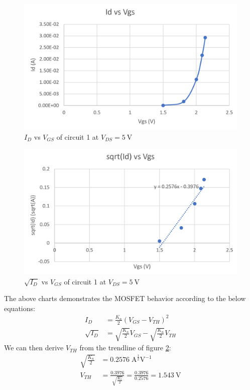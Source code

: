 \documentclass{article}
\begin{document}
\begin{figure}[H]
  \centering
  \includegraphics[width=\textwidth]{ECE2200L_Lab7_IV_1.png}
  \caption{$I_D$ vs $V_{GS}$ of circuit 1 at $V_{DS} = \SI{5}{\volt}$}
  \label{fig:IV1}
\end{figure}
\begin{figure}[H]
  \centering
  \includegraphics[width=\textwidth]{ECE2200L_Lab7_sqrt.png}
  \caption{$\sqrt{I_D}$ vs $V_{GS}$ of circuit 1 at $V_{DS} = \SI{5}{\volt}$}
  \label{fig:sqrt}
\end{figure}

The above charts demonstrates the MOSFET behavior according to the below equations:
\begin{align}\label{eqn:ckt1}
  I_D&=\frac{K_n}{2}\left(V_{GS}-V_{TH}\right)^2\\
  \sqrt{I_D}&=\sqrt{\frac{K_n}{2}}V_{GS}-\sqrt{\frac{K_n}{2}}V_{TH}
\end{align}
We can then derive $V_{TH}$ from the trendline of figure \ref{fig:sqrt}:
\begin{align}\label{eqn:calc1}
  \sqrt{\frac{K_n}{2}}&=0.2576\;\text{A}^{\frac{1}{2}}\text{V}^{-1}\\
  V_{TH}&= \frac{0.3976}{\sqrt{\frac{K_n}{2}}}=\frac{0.3976}{0.2576}=\SI{1.543}{\volt}
\end{align}
\end{document}
